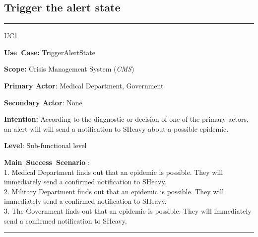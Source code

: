 \subsection{Trigger the alert state}
\vspace{0.5cm}
\hrule
\vspace{0.5cm}
\begin{lyxlist}{UC1}
\small{
\item [\textbf{Use~Case:}] TriggerAlertState
\item [\textbf{Scope:}] Crisis Management System (\emph{CMS})
\item [\textbf{Primary Actor}:] Medical Department, Government
\item [\textbf{Secondary Actor}:] None
\item [\textbf{Intention:}] According to the diagnostic or decision of one of
the primary actors, an alert will will send a notification to SHeavy about a
possible epidemic.
\item [\textbf{Level}:]Sub-functional level
\item [\textbf{Main~Success~Scenario}]:\\
1. Medical Department finds out that an epidemic is possible. They will
immediately send a confirmed notification to SHeavy.\\
2. Military Department finds out that an epidemic is possible. They will
immediately send a confirmed notification to SHeavy.\\
3. The Government finds out that an epidemic is possible. They will
immediately send a confirmed notification to SHeavy.\\
}
\end{lyxlist}
\hrule 
\vspace{0.5cm} 

